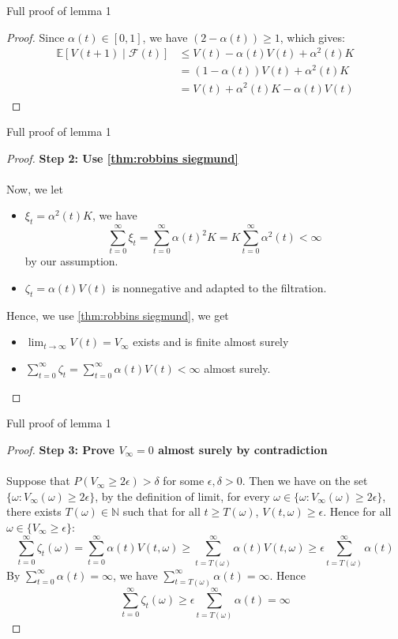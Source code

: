 \documentclass[aspectratio=169]{beamer} %
\begin{document}
\begin{frame}{Full proof of lemma 1}
\begin{proof}
    \noindent Since $\alpha(t) \in [0,1]$, we have $(2 - \alpha(t)) \geq 1$, which gives:
\begin{align*}
\mathbb{E}[V(t+1) \mid \mathcal{F}(t)] &\leq V(t) - \alpha(t)V(t) + \alpha^2(t)K \\
&= (1 - \alpha(t))V(t) + \alpha^2(t)K\\
&= V(t) + \alpha^2(t) K -\alpha(t) V(t)
\end{align*}
\end{proof}
    
\end{frame}
\begin{frame}{Full proof of lemma 1}
\begin{proof}
    \textbf{Step 2: Use \autoref{thm:robbins siegmund}}\\
\\
\noindent Now, we let
\begin{itemize}
    \item $\xi_t = \alpha^2(t)K$, we have 
    $$
    \sum_{t=0}^\infty \xi_t  = \sum_{t=0}^\infty \alpha(t)^2K = K\sum_{t=0}^\infty \alpha^2(t) <\infty
    $$
    by our assumption. 
    \item $\zeta_t = \alpha(t)V(t)$ is nonnegative and adapted to the filtration. 
\end{itemize}
Hence, we use \autoref{thm:robbins siegmund}, we get
\begin{itemize}
    \item $\lim_{t\to\infty} V(t) = V_\infty$ exists and is finite almost surely
    \item $\sum_{t=0}^\infty \zeta_t = \sum_{t=0}^\infty \alpha(t) V(t)<\infty$ almost surely.
\end{itemize}
\end{proof}
\end{frame}
\begin{frame}{Full proof of lemma 1}
\begin{proof}
    \textbf{Step 3: Prove $V_\infty =0$ almost surely by contradiction}\\
\\
Suppose that $P(V_\infty\ge 2\epsilon)>\delta$ for some $\epsilon, \delta>0$. Then we have on the set $\{\omega: V_\infty(\omega)\ge 2\epsilon\}$, by the definition of limit, for every $\omega\in \{\omega: V_\infty(\omega)\ge 2\epsilon\}$, there exists $T(\omega)\in\mathbb{N}$ such that for all $t\ge T(\omega)$, $V(t,\omega)\ge \epsilon$. Hence for all $\omega\in\{V_\infty\ge \epsilon\}$:
$$
\sum_{t=0}^\infty \zeta_t(\omega) = \sum_{t=0}^\infty \alpha(t)V(t,\omega)\ge \sum_{t=T(\omega)}^\infty \alpha(t) V(t,\omega)\ge \epsilon\sum_{t=T(\omega)}^\infty \alpha (t)
$$
By $\sum_{t=0}^\infty \alpha (t) = \infty$, we have $\sum_{t=T(\omega)}^\infty \alpha(t) = \infty$. Hence
$$
\sum_{t=0}^\infty \zeta_t(\omega) \ge \epsilon\sum_{t=T(\omega)}^\infty \alpha (t) = \infty
$$
\end{proof}
\end{frame}
\end{document}
